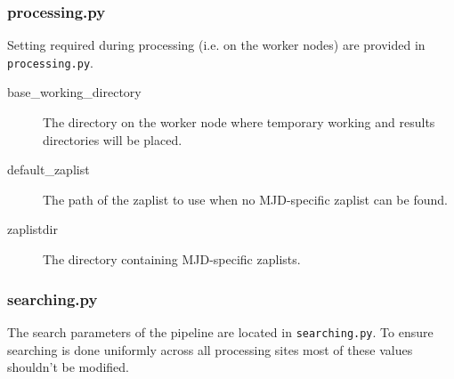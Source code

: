 \subsubsection{processing.py}
Setting required during processing (i.e. on the worker nodes) are provided in \texttt{processing.py}.

\begin{description}
    \item[base\_working\_directory] The directory on the worker node where temporary working and results directories will be placed.
    \item[default\_zaplist] The path of the zaplist to use when no MJD-specific zaplist can be found.
    \item[zaplistdir] The directory containing MJD-specific zaplists.
\end{description}


\subsubsection{searching.py}
The search parameters of the pipeline are located in \texttt{searching.py}. To ensure searching is done uniformly across all processing sites most of these values shouldn't be modified.

